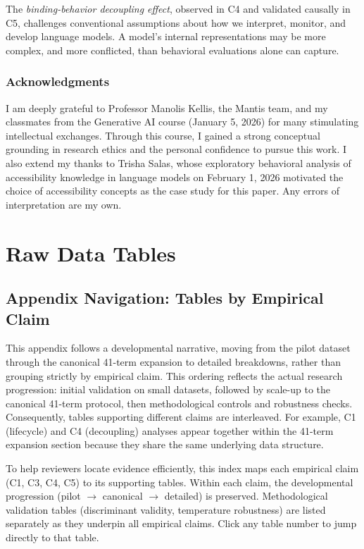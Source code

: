 \documentclass[10pt]{article} %
\begin{document}
The \emph{binding-behavior decoupling effect}, observed in C4 and validated causally in C5, challenges conventional assumptions about how we interpret, monitor, and develop language models.
A model's internal representations may be more complex, and more conflicted, than behavioral evaluations alone can capture.

\subsubsection*{Acknowledgments}
I am deeply grateful to Professor Manolis Kellis, the Mantis team, and my classmates from the Generative AI course (January 5, 2026) for many stimulating intellectual exchanges. Through this course, I gained a strong conceptual grounding in research ethics and the personal confidence to pursue this work. I also extend my thanks to Trisha Salas, whose exploratory behavioral analysis of accessibility knowledge in language models \citep{salas2026testing} on February 1, 2026 motivated the choice of accessibility concepts as the case study for this paper. Any errors of interpretation are my own.

\pagebreak
\appendix

\section{Raw Data Tables}

\subsection*{Appendix Navigation: Tables by Empirical Claim}\mbox{}

\noindent This appendix follows a developmental narrative, moving from the pilot dataset through the canonical 41-term expansion to detailed breakdowns, rather than grouping strictly by empirical claim. This ordering reflects the actual research progression: initial validation on small datasets, followed by scale-up to the canonical 41-term protocol, then methodological controls and robustness checks. Consequently, tables supporting different claims are interleaved. For example, C1 (lifecycle) and C4 (decoupling) analyses appear together within the 41-term expansion section because they share the same underlying data structure.

\noindent To help reviewers locate evidence efficiently, this index maps each empirical claim (C1, C3, C4, C5) to its supporting tables. Within each claim, the developmental progression (pilot $\to$ canonical $\to$ detailed) is preserved. Methodological validation tables (discriminant validity, temperature robustness) are listed separately as they underpin all empirical claims. Click any table number to jump directly to that table.
\end{document}
